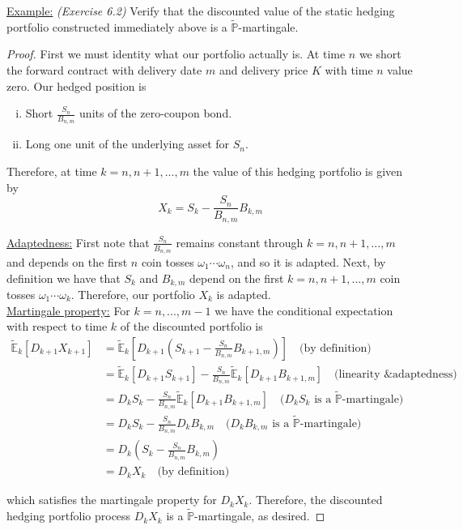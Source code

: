 \documentclass[12pt]{article}
\renewcommand{\P}{\mathbb P}
\newcommand{\E}{\mathbb E}
\begin{document}
\underline{Example:} {\em (Exercise 6.2)} Verify that the discounted value of the static hedging portfolio constructed immediately above is a $\tilde{\P}$-martingale. \\

\begin{proof} First we must identity what our portfolio actually is. At time $n$ we short the forward contract with delivery date $m$ and delivery price $K$ with time $n$ value zero. Our hedged position is
\begin{enumerate}[(i)]
	\item Short $\frac{S_n}{B_{n,m}}$ units of the zero-coupon bond.
	\item Long one unit of the underlying asset for $S_n$.
\end{enumerate}

Therefore, at time $k = n, n + 1,...,m$ the value of this hedging portfolio is given by
\begin{equation*}
	X_k = S_k - \frac{S_n}{B_{n,m}} B_{k,m}
\end{equation*}

\underline{Adaptedness:} First note that $\frac{S_n}{B_{n,m}}$ remains constant through $k = n, n + 1,...,m$ and depends on the first $n$ coin tosses $\omega_1\cdots\omega_n$, and so it is adapted. Next, by definition we have that $S_k$ and $B_{k,m}$ depend on the first $k = n, n + 1,..., m$ coin tosses $\omega_1\cdots\omega_k$. Therefore, our portfolio $X_k$ is adapted. \\

\underline{Martingale property:} For $k = n,..., m -1$ we have the conditional expectation with respect to time $k$ of the discounted portfolio is
\begin{align*}
	\tilde{\E}_k \left[ D_{k + 1}X_{k + 1} \right] &= \tilde{\E}_k \left[ D_{k + 1} \left( S_{k + 1} - \frac{ S_n }{ B_{n,m} } B_{k + 1,m} \right) \right] \quad \text{(by definition)} \\
	&= \tilde{\E}_k \left[ D_{k + 1}S_{k + 1} \right] - \frac{ S_n }{ B_{n,m} } \tilde{\E}_k \left[ D_{k + 1}B_{k + 1,m} \right] \quad \text{(linearity \& adaptedness)} \\
	&= D_kS_k - \frac{ S_n }{ B_{n,m} } \tilde{\E}_k \left[ D_{k + 1}B_{k + 1,m} \right] \quad \text{($D_kS_k$ is a $\tilde{\P}$-martingale)} \\
	&= D_kS_k - \frac{ S_n }{ B_{n,m} } D_{k}B_{k,m}  \quad \text{($D_kB_{k,m}$ is a $\tilde{\P}$-martingale)} \\
	&= D_k \left( S_k - \frac{ S_n }{ B_{n,m} } B_{k,m} \right) \\
	&= D_kX_k \quad \text{(by definition)}
\end{align*}

which satisfies the martingale property for $D_kX_k$. Therefore, the discounted hedging portfolio process $D_kX_k$ is a $\tilde{\P}$-martingale, as desired.
\end{proof}
\end{document}

